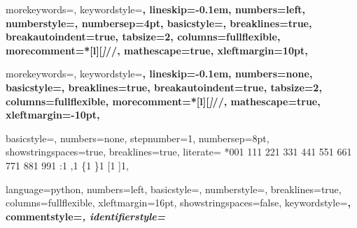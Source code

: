 \makeatletter
\global\let\tikz@ensure@dollar@catcode=\relax
\makeatother


{
  morekeywords={},
  keywordstyle=\bfseries,
  lineskip=-0.1em,
  numbers=left, %
  numberstyle=\jnumberstyle,
  numbersep=4pt,
  basicstyle=\jbasicstyle,
  breaklines=true,
  breakautoindent=true,
  tabsize=2,
  columns=fullflexible,
  morecomment=*[l][\textsl]{//},
  mathescape=true,
  xleftmargin=10pt,
}

{
  morekeywords={},
  keywordstyle=\bfseries,
  lineskip=-0.1em,
  numbers=none,
  basicstyle=\jbasicstyle,
  breaklines=true,
  breakautoindent=true,
  tabsize=2,
  columns=fullflexible,
  morecomment=*[l][\textsl]{//},
  mathescape=true,
  xleftmargin=-10pt,
}

{
  basicstyle=\normalfont\ttfamily,
  numbers=none,
  stepnumber=1,
  numbersep=8pt,
  showstringspaces=true,
  breaklines=true,
  literate=
    *{0}{{{\color{numb}0}}}{1}
     {1}{{{\color{numb}1}}}{1}
     {2}{{{\color{numb}2}}}{1}
     {3}{{{\color{numb}3}}}{1}
     {4}{{{\color{numb}4}}}{1}
     {5}{{{\color{numb}5}}}{1}
     {6}{{{\color{numb}6}}}{1}
     {7}{{{\color{numb}7}}}{1}
     {8}{{{\color{numb}8}}}{1}
     {9}{{{\color{numb}9}}}{1}
     {:}{{{\color{punct}{:}}}}{1}
     {,}{{{\color{punct}{,}}}}{1}
     {\{}{{{\color{delim}{\{}}}}{1}
     {\}}{{{\color{delim}{\}}}}}{1}
     {[}{{{\color{delim}{[}}}}{1}
     {]}{{{\color{delim}{]}}}}{1},
}

{
  language=python,
  numbers=left,
  basicstyle=\jbasicstyle,
  numberstyle=\jnumberstyle,
  breaklines=true,
  columns=fullflexible,
  xleftmargin=16pt,
  showstringspaces=false,
  keywordstyle=\bfseries\color{green!40!black},
  commentstyle=\itshape\color{purple!40!black},
  identifierstyle=\color{blue}
}


\newcommand{\JsonIn}[1]{{\lstinline[language=json-pretty, basicstyle=\small\ttfamily]@#1@}}

